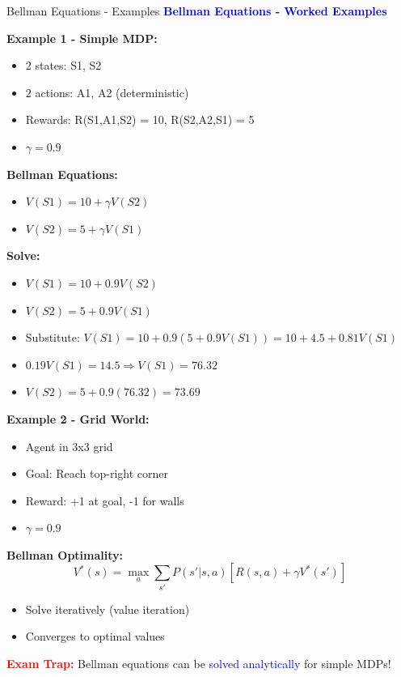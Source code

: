 \documentclass[8pt]{beamer}
\begin{document}
	\begin{frame}{Bellman Equations - Examples}
		\fontsize{6.5}{7.5}\selectfont
		\textcolor{blue}{\textbf{Bellman Equations - Worked Examples}}
		
		\textbf{Example 1 - Simple MDP:}
		\begin{itemize}
			\item 2 states: S1, S2
			\item 2 actions: A1, A2 (deterministic)
			\item Rewards: R(S1,A1,S2) = 10, R(S2,A2,S1) = 5
			\item $\gamma = 0.9$
		\end{itemize}
		
		\textbf{Bellman Equations:}
		\begin{itemize}
			\item $V(S1) = 10 + \gamma V(S2)$
			\item $V(S2) = 5 + \gamma V(S1)$
		\end{itemize}
		
		\textbf{Solve:}
		\begin{itemize}
			\item $V(S1) = 10 + 0.9V(S2)$
			\item $V(S2) = 5 + 0.9V(S1)$
			\item Substitute: $V(S1) = 10 + 0.9(5 + 0.9V(S1)) = 10 + 4.5 + 0.81V(S1)$
			\item $0.19V(S1) = 14.5 \Rightarrow V(S1) = 76.32$
			\item $V(S2) = 5 + 0.9(76.32) = 73.69$
		\end{itemize}
		
		\textbf{Example 2 - Grid World:}
		\begin{itemize}
			\item Agent in 3x3 grid
			\item Goal: Reach top-right corner
			\item Reward: +1 at goal, -1 for walls
			\item $\gamma = 0.9$
		\end{itemize}
		
		\textbf{Bellman Optimality:}
		\[
		V^*(s) = \max_a \sum_{s'} P(s'|s,a)[R(s,a) + \gamma V^*(s')]
		\]
		\begin{itemize}
			\item Solve iteratively (value iteration)
			\item Converges to optimal values
		\end{itemize}
		
		\textcolor{red}{\textbf{Exam Trap:}} Bellman equations can be \textcolor{blue}{solved analytically} for simple MDPs!
	\end{frame}
	
\end{document}
